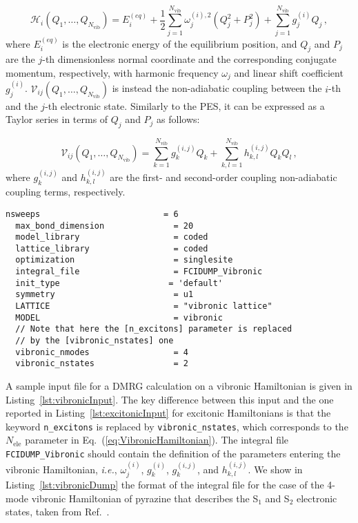 \documentclass[bibliography=totoc,12pt,a4paper]{scrartcl}
\begin{document}
\begin{equation}
  \mathcal{H}_{i}(Q_1,\ldots,Q_{N_\text{vib}}) = E_i^{(eq)}
	+ \frac{1}{2} \sum_{j=1}^{N_\text{vib}} \omega_j^{(i),2} \left( Q_j^2  + P_j^2 \right) 
	+ \sum_{j=1}^{N_\text{vib}} g_{j}^{(i)} Q_j \, ,
  \label{eq:DiagonalVibronic}
\end{equation}
%
where $E_i^{(eq)}$ is the electronic energy of the equilibrium position, and $Q_j$ and $P_j$ are the $j$-th dimensionless  normal coordinate and the corresponding conjugate momentum, respectively, with harmonic frequency $\omega_j$ and linear shift coefficient $g_{j}^{(i)}$.
$\mathcal{V}_{ij}(Q_1,\ldots,Q_{N_\text{vib}})$ is instead the non-adiabatic coupling between the $i$-th and the $j$-th electronic state.
Similarly to the PES, it can be expressed as a Taylor series in terms of $Q_j$ and $P_j$ as follows:

\begin{equation}
  \mathcal{V}_{ij}(Q_1,\ldots,Q_{N_\text{vib}}) =
   \sum_{k=1}^{N_\text{vib}} g_k^{(i,j)} Q_k
	+ \sum_{k,l=1}^{N_\text{vib}} h_{k,l}^{(i,j)} Q_k Q_l \, ,
  \label{eq:OffDiagonalVibronic}
\end{equation}
%
where $g_k^{(i,j)}$ and $h_{k,l}^{(i,j)}$ are the first- and second-order coupling non-adiabatic coupling terms, respectively.

\begin{lstlisting}[language=qcmaquis,
				   caption={Input example for a vibronic DMRG calculation},
				   label=lst:vibronicInput]
  nsweeps                         = 6
  max_bond_dimension              = 20
  model_library                   = coded
  lattice_library                 = coded
  optimization                    = singlesite
  integral_file                   = FCIDUMP_Vibronic
  init_type                      = 'default'
  symmetry                        = u1
  LATTICE                         = "vibronic lattice"
  MODEL                           = vibronic
  // Note that here the [n_excitons] parameter is replaced 
  // by the [vibronic_nstates] one
  vibronic_nmodes                 = 4
  vibronic_nstates                = 2
\end{lstlisting}

A sample input file for a DMRG calculation on a vibronic Hamiltonian is given in Listing~\ref{lst:vibronicInput}.
The key difference between this input and the one reported in Listing~\ref{lst:excitonicInput} for excitonic Hamiltonians is that the keyword \texttt{n\_excitons} is replaced by \texttt{vibronic\_nstates}, which corresponds to the $N_\text{ele}$ parameter in Eq.~(\ref{eq:VibronicHamiltonian}).
The integral file \texttt{FCIDUMP\_Vibronic} should contain the definition of the parameters entering the vibronic Hamiltonian, \textit{i.e.}, $\omega_j^{(i)}$, $g_k^{(i)}$, $g_k^{(i,j)}$, and $h_{k,l}^{(i,j)}$.
We show in Listing~\ref{lst:vibronicDump} the format of the integral file for the case of the 4-mode vibronic Hamiltonian of pyrazine that describes the S$_1$ and S$_2$ electronic states, taken from Ref.~.
\end{document}
